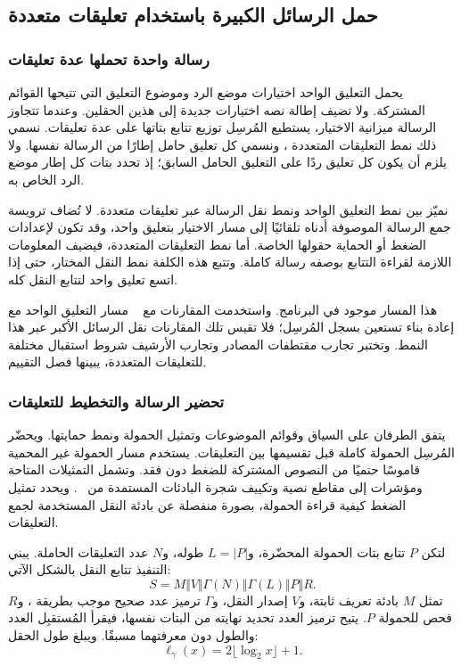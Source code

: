 \subsection{حمل الرسائل الكبيرة باستخدام تعليقات متعددة}
\label{sec:multiframe}


\subsubsection{رسالة واحدة تحملها عدة تعليقات}
يحمل التعليق الواحد اختيارات موضع الرد وموضوع التعليق التي تتيحها القوائم المشتركة. ولا تضيف إطالة نصه اختيارات جديدة إلى هذين الحقلين. وعندما تتجاوز الرسالة ميزانية الاختيار، يستطيع المُرسِل توزيع تتابع بتاتها على عدة تعليقات. نسمي ذلك نمط التعليقات المتعددة ، ونسمي كل تعليق حامل إطارًا من الرسالة نفسها. ولا يلزم أن يكون كل تعليق ردًا على التعليق الحامل السابق؛ إذ تحدد بتات كل إطار موضع الرد الخاص به.

نميّز بين نمط التعليق الواحد ونمط نقل الرسالة عبر تعليقات متعددة. لا تُضاف ترويسة جمع الرسالة الموصوفة أدناه تلقائيًا إلى مسار الاختيار بتعليق واحد، وقد تكون لإعدادات الضغط أو الحماية حقولها الخاصة. أما نمط التعليقات المتعددة، فيضيف المعلومات اللازمة لقراءة التتابع بوصفه رسالة كاملة. وتتبع هذه الكلفة نمط النقل المختار، حتى إذا اتسع تعليق واحد لتتابع النقل كله.

هذا المسار موجود في البرنامج. واستخدمت المقارنات مع ~\cite{lin2024zero} مسار التعليق الواحد مع إعادة بناء تستعين بسجل المُرسِل؛ فلا تقيس تلك المقارنات نقل الرسائل الأكبر عبر هذا النمط. وتختبر تجارب مقتطفات المصادر وتجارب الأرشيف شروط استقبال مختلفة للتعليقات المتعددة، يبينها فصل التقييم.

\subsubsection{تحضير الرسالة والتخطيط للتعليقات}
يتفق الطرفان على السياق وقوائم الموضوعات وتمثيل الحمولة ونمط حمايتها. ويحضّر المُرسِل الحمولة كاملة قبل تقسيمها بين التعليقات. يستخدم مسار الحمولة غير المحمية قاموسًا حتميًا من النصوص المشتركة للضغط دون فقد. وتشمل التمثيلات المتاحة  ومؤشرات إلى مقاطع نصية وتكييف شجرة البادئات المستمدة من ~\cite{zillien2024oppression}. ويحدد تمثيل الضغط كيفية قراءة الحمولة، بصورة منفصلة عن بادئة النقل المستخدمة لجمع التعليقات.

لتكن $P$ تتابع بتات الحمولة المحضّرة، و$L=|P|$ طوله، و$N$ عدد التعليقات الحاملة. يبني التنفيذ تتابع النقل بالشكل الآتي:
\[
S=M\Vert V\Vert\Gamma(N)\Vert\Gamma(L)\Vert P\Vert R.
\]
تمثل $M$ بادئة تعريف ثابتة، و$V$ إصدار النقل، و$\Gamma$ ترميز عدد صحيح موجب بطريقة ، و$R$ فحص  للحمولة $P$. يتيح ترميز العدد تحديد نهايته من البتات نفسها، فيقرأ المُستقبِل العدد والطول دون معرفتهما مسبقًا. ويبلغ طول الحقل:
\[
\ell_\gamma(x)=2\lfloor\log_2 x\rfloor+1.
\]

